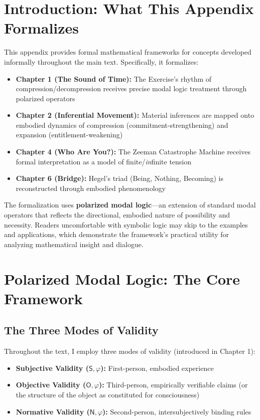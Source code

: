 \documentclass[12pt]{book}
\begin{document}
\section*{Introduction: What This Appendix Formalizes}

This appendix provides formal mathematical frameworks for concepts developed informally throughout the main text. Specifically, it formalizes:

\begin{itemize}
\item \textbf{Chapter 1 (The Sound of Time):} The Exercise's rhythm of compression/decompression receives precise modal logic treatment through polarized operators
\item \textbf{Chapter 2 (Inferential Movement):} Material inferences are mapped onto embodied dynamics of compression (commitment-strengthening) and expansion (entitlement-weakening)
\item \textbf{Chapter 4 (Who Are You?):} The Zeeman Catastrophe Machine receives formal interpretation as a model of finite/\textit{in}finite tension
\item \textbf{Chapter 6 (Bridge):} Hegel's triad (Being, Nothing, Becoming) is reconstructed through embodied phenomenology
\end{itemize}

The formalization uses \textbf{polarized modal logic}---an extension of standard modal operators that reflects the directional, embodied nature of possibility and necessity. Readers uncomfortable with symbolic logic may skip to the examples and applications, which demonstrate the framework's practical utility for analyzing mathematical insight and dialogue.

\section{Polarized Modal Logic: The Core Framework}

\subsection{The Three Modes of Validity}

Throughout the text, I employ three modes of validity (introduced in Chapter 1):

\begin{itemize}
    \item \textbf{Subjective Validity ($\mathsf{S},\varphi$):} First-person, embodied experience
    \item \textbf{Objective Validity ($\mathsf{O},\varphi$):} Third-person, empirically verifiable claims (or the structure of the object as constituted for consciousness)
    \item \textbf{Normative Validity ($\mathsf{N},\varphi$):} Second-person, intersubjectively binding rules
\end{itemize}
\end{document}
